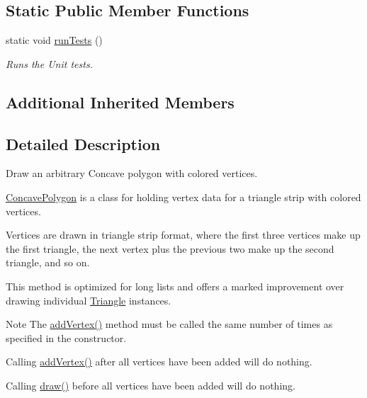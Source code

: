 \subsection*{Static Public Member Functions}
\begin{DoxyCompactItemize}
\item 
static void \hyperlink{classtsgl_1_1_concave_polygon_ace68fa148735bf43d9648cb58a04ac46}{run\-Tests} ()
\begin{DoxyCompactList}\small\item\em Runs the Unit tests. \end{DoxyCompactList}\end{DoxyCompactItemize}
\subsection*{Additional Inherited Members}


\subsection{Detailed Description}
Draw an arbitrary Concave polygon with colored vertices. 

\hyperlink{classtsgl_1_1_concave_polygon}{Concave\-Polygon} is a class for holding vertex data for a triangle strip with colored vertices.

Vertices are drawn in triangle strip format, where the first three vertices make up the first triangle, the next vertex plus the previous two make up the second triangle, and so on.

This method is optimized for long lists and offers a marked improvement over drawing individual \hyperlink{classtsgl_1_1_triangle}{Triangle} instances. \begin{DoxyNote}{Note}
The \hyperlink{classtsgl_1_1_concave_polygon_ae2675ff0bf54cc7092a9ab3418dcab30}{add\-Vertex()} method must be called the same number of times as specified in the constructor. 

Calling \hyperlink{classtsgl_1_1_concave_polygon_ae2675ff0bf54cc7092a9ab3418dcab30}{add\-Vertex()} after all vertices have been added will do nothing. 

Calling \hyperlink{classtsgl_1_1_concave_polygon_a06d759932483ae2b54bb807db20cbc4a}{draw()} before all vertices have been added will do nothing. 
\end{DoxyNote}



